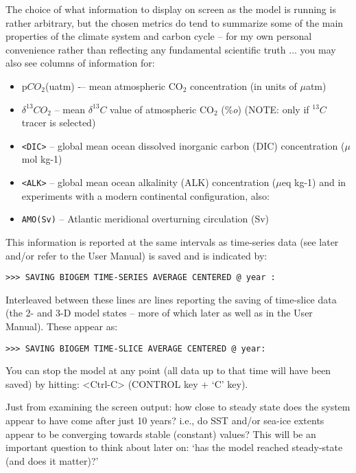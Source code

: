 \documentclass[11pt,fleqn]{book} %
\begin{document}
The choice of what information to display on screen as the model is running is rather arbitrary, but the chosen metrics do tend to summarize some of the main properties of the climate system and carbon cycle – for my own personal convenience rather than reflecting any fundamental scientific truth ... you may also see columns of information for: 

\begin{itemize}
\item[] p\(CO_{2}\)(uatm) -– mean atmospheric CO\(_{2}\) concentration (in units of \(\mu\)atm)
\item[] \(\delta^{13}CO_{2}\)  – mean \(\delta^{13}C\) value of atmospheric CO\(_{2}\) (\%\textit{o}) (NOTE: only if \(^{13}C\) tracer is selected)
\item[] \texttt{<DIC>} -- global mean ocean dissolved inorganic carbon (DIC) concentration (\(\mu\)mol kg-1)
\item[] \texttt{<ALK>}   – global mean ocean alkalinity (ALK) concentration (\(\mu\)eq kg-1) and in experiments with a modern continental configuration, also:
\item \texttt{AMO(Sv)} -- Atlantic meridional overturning circulation (Sv)
\end{itemize}

This information is reported at the same intervals as time-series data (see later and/or refer to the User Manual) is saved and is indicated by: 

\vspace{-2mm}
\begin{verbatim}
>>> SAVING BIOGEM TIME-SERIES AVERAGE CENTERED @ year :
\end{verbatim}
\vspace{-2mm}

Interleaved between these lines are lines reporting the saving of time-slice data (the 2- and 3-D model states – more of which later as well as in the User Manual). These appear as:

\vspace{-2mm}
\begin{verbatim}
>>> SAVING BIOGEM TIME-SLICE AVERAGE CENTERED @ year:
\end{verbatim}
\vspace{-2mm}

You can stop the model at any point (all data up to that time will have been saved) by hitting: \textsf{<Ctrl-C>} (\textsf{CONTROL} key + ‘\textsf{C}’ key).

Just from examining the screen output: how close to steady state does the system appear to have come after just 10 years? i.e., do SST and/or sea-ice extents appear to be converging towards stable (constant) values? This will be an important question to think about later on: ‘has the model reached steady-state (and does it matter)?’
\end{document}
